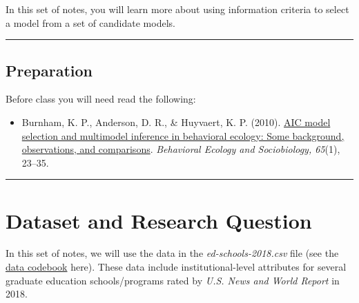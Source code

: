 \documentclass[]{book}
\newenvironment{Shaded}{\begin{snugshade}}{\end{snugshade}}
\newcommand{\CommentTok}[1]{\textcolor[rgb]{0.56,0.35,0.01}{\textit{#1}}}
\newcommand{\DataTypeTok}[1]{\textcolor[rgb]{0.13,0.29,0.53}{#1}}
\newcommand{\KeywordTok}[1]{\textcolor[rgb]{0.13,0.29,0.53}{\textbf{#1}}}
\newcommand{\NormalTok}[1]{#1}
\newcommand{\OperatorTok}[1]{\textcolor[rgb]{0.81,0.36,0.00}{\textbf{#1}}}
\newcommand{\StringTok}[1]{\textcolor[rgb]{0.31,0.60,0.02}{#1}}
\providecommand{\tightlist}{%
  \setlength{\itemsep}{0pt}\setlength{\parskip}{0pt}}
\begin{document}
In this set of notes, you will learn more about using information criteria to select a model from a set of candidate models.

\begin{center}\rule{0.5\linewidth}{\linethickness}\end{center}

\hypertarget{preparation-6}{%
\subsection*{Preparation}\label{preparation-6}}

Before class you will need read the following:

\begin{itemize}
\tightlist
\item
  Burnham, K. P., Anderson, D. R., \& Huyvaert, K. P. (2010). \href{https://link-springer-com.ezp3.lib.umn.edu/article/10.1007/s00265-010-1029-6}{AIC model selection and multimodel inference in behavioral ecology: Some background, observations, and comparisons}. \emph{Behavioral Ecology and Sociobiology, 65}(1), 23--35.
\end{itemize}

\begin{center}\rule{0.5\linewidth}{\linethickness}\end{center}

\hypertarget{dataset-and-research-question-5}{%
\section{Dataset and Research Question}\label{dataset-and-research-question-5}}

In this set of notes, we will use the data in the \emph{ed-schools-2018.csv} file (see the \protect\hyperlink{ed-schools-2018}{data codebook} here). These data include institutional-level attributes for several graduate education schools/programs rated by \emph{U.S. News and World Report} in 2018.

\begin{Shaded}
\end{Shaded}
\end{document}
